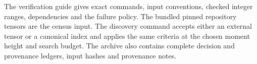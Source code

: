 The verification guide gives exact commands, input conventions, checked
integer ranges, dependencies and the failure policy. The bundled pinned
repository tensors are the census input. The discovery command
accepts either an external tensor or a canonical index and
applies the same criteria at the chosen moment height and search budget.
The archive also contains complete decision and provenance ledgers,
input hashes and provenance notes.
